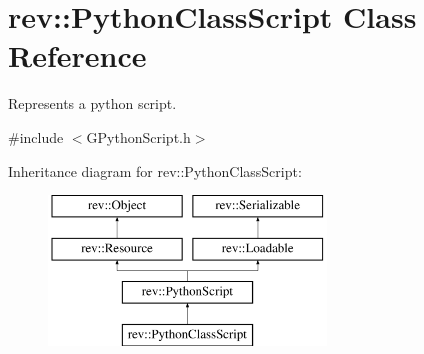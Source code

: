\hypertarget{classrev_1_1_python_class_script}{}\section{rev\+::Python\+Class\+Script Class Reference}
\label{classrev_1_1_python_class_script}


Represents a python script.  




{\ttfamily \#include $<$G\+Python\+Script.\+h$>$}

Inheritance diagram for rev\+::Python\+Class\+Script\+:\begin{figure}[H]
\begin{center}
\leavevmode
\includegraphics[height=4.000000cm]{classrev_1_1_python_class_script}
\end{center}
\end{figure}
